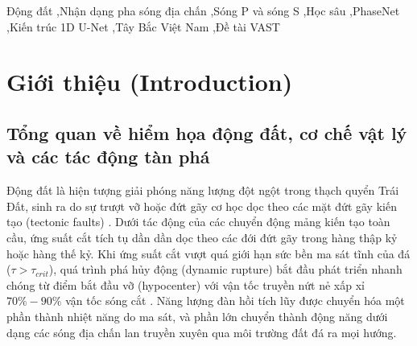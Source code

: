\documentclass[preprint,1p]{elsarticle}
\begin{document}
\begin{frontmatter}
\begin{keyword}
Động đất \sep Nhận dạng pha sóng địa chấn \sep Sóng P và sóng S \sep Học sâu \sep PhaseNet \sep Kiến trúc 1D U-Net \sep Tây Bắc Việt Nam \sep Đề tài VAST
\end{keyword}

\end{frontmatter}

\section{Giới thiệu (Introduction)}
\label{sec:intro}

\subsection{Tổng quan về hiểm họa động đất, cơ chế vật lý và các tác động tàn phá}
\label{sec:intro_damage}

Động đất là hiện tượng giải phóng năng lượng đột ngột trong thạch quyển Trái Đất, sinh ra do sự trượt vỡ hoặc đứt gãy cơ học dọc theo các mặt đứt gãy kiến tạo (tectonic faults) \cite{aki2002quantitative}. Dưới tác động của các chuyển động mảng kiến tạo toàn cầu, ứng suất cắt tích tụ dần dần dọc theo các đới đứt gãy trong hàng thập kỷ hoặc hàng thế kỷ. Khi ứng suất cắt vượt quá giới hạn sức bền ma sát tĩnh của đá ($\tau > \tau_{crit}$), quá trình phá hủy động (dynamic rupture) bắt đầu phát triển nhanh chóng từ điểm bắt đầu vỡ (hypocenter) với vận tốc truyền nứt nẻ xấp xỉ $70\% - 90\%$ vận tốc sóng cắt \cite{lay1995modern}. Năng lượng đàn hồi tích lũy được chuyển hóa một phần thành nhiệt năng do ma sát, và phần lớn chuyển thành động năng dưới dạng các sóng địa chấn lan truyền xuyên qua môi trường đất đá ra mọi hướng.
\end{document}
